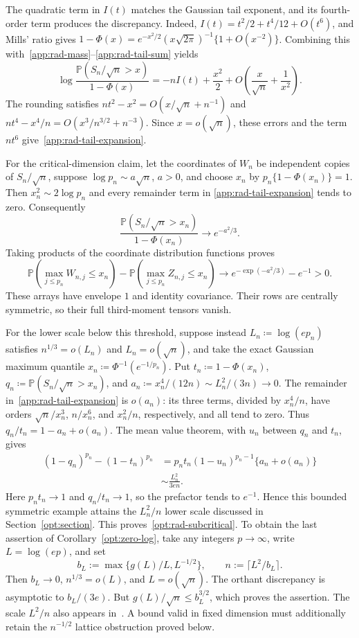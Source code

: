 \documentclass[11pt,letterpaper]{article}
\theoremstyle{remark}
\newcommand{\Pp}{\mathbb P}
\begin{document}
The quadratic term in \(I(t)\) matches the Gaussian tail exponent,
and its fourth-order term produces the discrepancy. Indeed,
\(I(t)=t^2/2+t^4/12+O(t^6)\), and Mills' ratio gives
\(1-\Phi(x)=e^{-x^2/2}(x\sqrt{2\pi})^{-1}\{1+O(x^{-2})\}\).
Combining this with~\eqref{app:rad-mass}--\eqref{app:rad-tail-sum}
yields
\[
 \log\frac{\Pp(S_n/\sqrt n>x)}{1-\Phi(x)}
 =-nI(t)+\frac{x^2}{2}
       +O\!\left(\frac{x}{\sqrt n}+\frac1{x^2}\right).
\]
The rounding satisfies
\(nt^2-x^2=O(x/\sqrt n+n^{-1})\) and
\(nt^4-x^4/n=O(x^3/n^{3/2}+n^{-3})\).
Since \(x=o(\sqrt n)\), these errors and the term \(nt^6\)
give~\eqref{app:rad-tail-expansion}.

For the critical-dimension claim, let the coordinates of \(W_n\)
be independent copies of \(S_n/\sqrt n\), suppose
\(\log p_n\sim a\sqrt n\), \(a>0\), and choose \(x_n\) by
\(p_n\{1-\Phi(x_n)\}=1\). Then
\(x_n^2\sim2\log p_n\) and every remainder term in
\eqref{app:rad-tail-expansion} tends to zero. Consequently
\[
 \frac{\Pp(S_n/\sqrt n>x_n)}{1-\Phi(x_n)}
 \longrightarrow e^{-a^2/3}.
\]
Taking products of the coordinate distribution functions proves
\begin{equation}
 \Pp(\max_{j\le p_n}W_{n,j}\le x_n)
 -\Pp(\max_{j\le p_n}Z_{n,j}\le x_n)
 \longrightarrow e^{-\exp(-a^2/3)}-e^{-1}>0.
 \label{app:rad-critical}
\end{equation}
These arrays have envelope \(1\) and identity covariance. Their rows
are centrally symmetric, so their full third-moment tensors vanish.

For the lower scale below this threshold, suppose instead
\(L_n\coloneqq\log(ep_n)\) satisfies \(n^{1/3}=o(L_n)\) and
\(L_n=o(\sqrt n)\), and take the exact
Gaussian maximum quantile \(x_n\coloneqq\Phi^{-1}(e^{-1/p_n})\).
Put \(t_n\coloneqq1-\Phi(x_n)\),
\(q_n\coloneqq\Pp(S_n/\sqrt n>x_n)\), and
\(a_n\coloneqq x_n^4/(12n)\sim L_n^2/(3n)\to0\).
The remainder in~\eqref{app:rad-tail-expansion} is \(o(a_n)\): its
three terms, divided by \(x_n^4/n\), have orders
\(\sqrt n/x_n^3\), \(n/x_n^6\), and \(x_n^2/n\), respectively,
and all tend to zero. Thus \(q_n/t_n=1-a_n+o(a_n)\).
The mean value theorem, with \(u_n\) between \(q_n\) and \(t_n\), gives
\begin{align*}
 (1-q_n)^{p_n}-(1-t_n)^{p_n}
 &=p_nt_n(1-u_n)^{p_n-1}\{a_n+o(a_n)\}\\
 &\sim\frac{L_n^2}{3en}.
\end{align*}
Here \(p_nt_n\to1\) and \(q_n/t_n\to1\), so the prefactor tends
to \(e^{-1}\). Hence this bounded symmetric example attains the
\(L_n^2/n\) lower scale discussed in Section~\ref{opt:section}.
This proves~\eqref{opt:rad-subcritical}. To obtain the last assertion
of Corollary~\ref{opt:zero-log}, take any integers \(p\to\infty\),
write \(L=\log(ep)\), and set
\[
 b_L:=\max\{g(L)/L,L^{-1/2}\},\qquad n:=\lceil L^2/b_L\rceil.
\]
Then \(b_L\to0\), \(n^{1/3}=o(L)\), and \(L=o(\sqrt n)\).
The orthant
discrepancy is asymptotic to \(b_L/(3e)\). But
\(g(L)/\sqrt n\le b_L^{3/2}\), which proves the assertion.
The scale \(L^2/n\) also appears in~\cite[Proposition~4.1]{CCK}. A bound
valid in fixed dimension must additionally retain the
\(n^{-1/2}\) lattice obstruction proved below.
\end{document}
